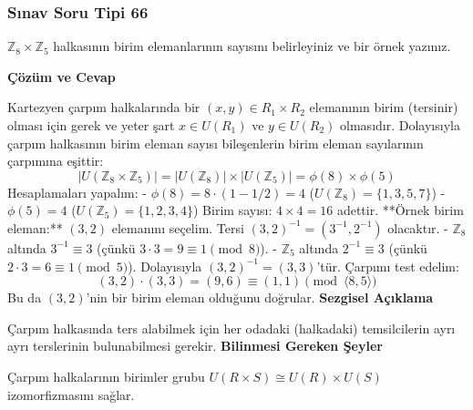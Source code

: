 \documentclass[11pt, a4paper]{article}
\newenvironment{cozum}{
    \vspace{0.5cm}
    \noindent\textcolor{green!60!black}{\faCheckCircle\enspace \textbf{\Large Çözüm ve Cevap}}\par\vspace{0.2cm}
}{}
\newenvironment{sezgisel}{
    \vspace{0.5cm}
    \noindent\textcolor{orange!80!black}{\faLightbulb\enspace \textbf{\Large Sezgisel Açıklama}}\par\vspace{0.2cm}
    \itshape
}{}
\newenvironment{bilgi}{
    \vspace{0.5cm}
    \noindent\textcolor{red!70!black}{\faExclamationTriangle\enspace \textbf{\Large Bilinmesi Gereken Şeyler}}\par\vspace{0.2cm}
}{}
\begin{document}
\subsubsection{Sınav Soru Tipi 66}
\begin{sinavbox}
$\mathbb{Z}_{8} \times \mathbb{Z}_{5}$ halkasının birim elemanlarının sayısını belirleyiniz ve bir örnek yazınız.
\end{sinavbox}
\begin{cozum}
Kartezyen çarpım halkalarında bir $(x, y) \in R_1 \times R_2$ elemanının birim (tersinir) olması için gerek ve yeter şart $x \in U(R_1)$ ve $y \in U(R_2)$ olmasıdır.
Dolayısıyla çarpım halkasının birim eleman sayısı bileşenlerin birim eleman sayılarının çarpımına eşittir:
\[ |U(\mathbb{Z}_8 \times \mathbb{Z}_5)| = |U(\mathbb{Z}_8)| \times |U(\mathbb{Z}_5)| = \phi(8) \times \phi(5) \]
Hesaplamaları yapalım:
- $\phi(8) = 8 \cdot (1 - 1/2) = 4$ ($U(\mathbb{Z}_8) = \{1, 3, 5, 7\}$)
- $\phi(5) = 4$ ($U(\mathbb{Z}_5) = \{1, 2, 3, 4\}$)
Birim sayısı: $4 \times 4 = 16$ adettir.
**Örnek birim eleman:** $(3, 2)$ elemanını seçelim.
Tersi $(3, 2)^{-1} = (3^{-1}, 2^{-1})$ olacaktır.
- $\mathbb{Z}_8$ altında $3^{-1} \equiv 3$ (çünkü $3 \cdot 3 = 9 \equiv 1 \pmod 8$).
- $\mathbb{Z}_5$ altında $2^{-1} \equiv 3$ (çünkü $2 \cdot 3 = 6 \equiv 1 \pmod 5$).
Dolayısıyla $(3, 2)^{-1} = (3, 3)$'tür. Çarpımı test edelim:
\[ (3, 2) \cdot (3, 3) = (9, 6) \equiv (1, 1) \pmod{\langle 8, 5 \rangle} \]
Bu da $(3, 2)$'nin bir birim eleman olduğunu doğrular.
\end{cozum}
\begin{sezgisel}
Çarpım halkasında ters alabilmek için her odadaki (halkadaki) temsilcilerin ayrı ayrı terslerinin bulunabilmesi gerekir.
\end{sezgisel}
\begin{bilgi}
Çarpım halkalarının birimler grubu $U(R \times S) \cong U(R) \times U(S)$ izomorfizmasını sağlar.
\end{bilgi}

\newpage
\end{document}
